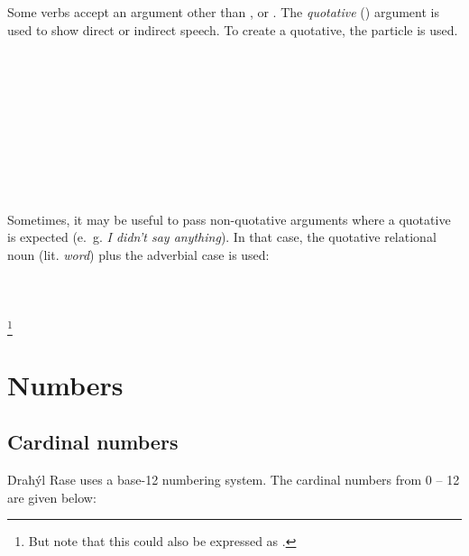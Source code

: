 \documentclass{book}
\begin{document}
Some verbs accept an argument other than ,  or . The \emph{quotative} () argument is used to show direct or indirect speech. To create a quotative, the particle  is used. \\
~\\
   \\
   \\
\emph{ } \\
~\\
   \\
   \\
\emph{  } \\
~

Sometimes, it may be useful to pass non-quotative arguments where a quotative is expected (e.~g. \emph{I didn't say anything}). In that case, the quotative relational noun  (lit. \emph{word}) plus the adverbial case is used: \\
~\\
   \\
   \\
\emph{   }\footnote{But note that this could also be expressed as .}


\chapter{Numbers}

\section{Cardinal numbers}

Ḋraħýl Rase uses a base-12 numbering system. The cardinal numbers from 0 -- 12 are given below:
\end{document}
